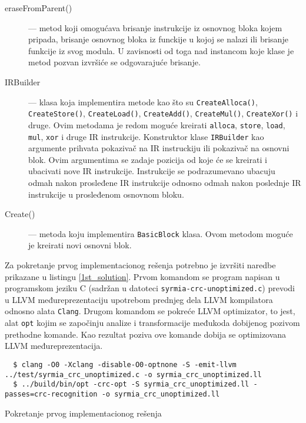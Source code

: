 \documentclass[12pt,oneside]{memoir}
\begin{document}
\begin{description}
  
  \item[eraseFromParent()] --- metod koji omogućava brisanje instrukcije iz osnovnog bloka kojem pripada, brisanje osnovnog bloka iz funckije u kojoj se nalazi ili brisanje funkcije iz svog modula. U zavisnosti od toga nad instancom koje klase je metod pozvan izvršiće se odgovarajuće brisanje. 

  \item[IRBuilder] --- klasa koja implementira metode kao što su \texttt{CreateAlloca()}, \texttt{CreateStore()}, \texttt{CreateLoad()}, \texttt{CreateAdd()}, \texttt{CreateMul()}, \texttt{CreateXor()} i druge. Ovim metodama je redom moguće kreirati \texttt{alloca}, \texttt{store}, \texttt{load}, \texttt{mul}, \texttt{xor} i druge IR instrukcije. Konstruktor klase \texttt{IRBuilder} kao argumente prihvata pokazivač na IR instruckiju ili pokazivač na osnovni blok. Ovim argumentima se zadaje pozicija od koje će se kreirati i ubacivati nove IR instrukcije. Instrukcije se podrazumevano ubacuju odmah nakon prosleđene IR instrukcije odnosno odmah nakon poslednje IR instrukcije u prosleđenom osnovnom bloku.
  
  \item[Create()] --- metoda koju implementira \texttt{BasicBlock} klasa. Ovom metodom moguće je kreirati novi osnovni blok. 
  
\end{description}

Za pokretanje prvog implementacionog rešenja potrebno je izvršiti naredbe prikazane u listingu \ref{1st_solution}.
Prvom komandom se program napisan u programskom jeziku C (sadržan u datoteci 
\texttt{syrmia-crc-unoptimized.c}) prevodi u LLVM međureprezentaciju upotrebom prednjeg dela LLVM kompilatora odnosno alata \texttt{Clang}. Drugom komandom se pokreće LLVM optimizator, to jest, alat \texttt{opt} kojim se započinju analize i transformacije međukoda dobijenog pozivom prethodne komande. Kao rezultat poziva ove komande dobija se optimizovana LLVM međureprezentacija. 

\begin{listing}[!ht]
\begin{verbatim}
  $ clang -O0 -Xclang -disable-O0-optnone -S -emit-llvm ../test/syrmia_crc_unoptimized.c -o syrmia_crc_unoptimized.ll
  $ ../build/bin/opt -crc-opt -S syrmia_crc_unoptimized.ll -passes=crc-recognition -o syrmia_crc_unoptimized.ll
\end{verbatim}
\caption{Pokretanje prvog implementacionog rešenja} 
\label{1st_solution}
\end{listing}
\end{document}
